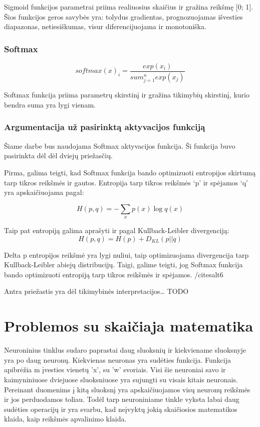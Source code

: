 \documentclass{VUMIFInfKursinis}
\begin{document}
\par
Sigmoid funkcijos parametrai priima realiuosius skaičius ir gražina reikšmę [0; 1].
Šios funkcijos geros savybės yra: tolydus gradientas, prognozuojamas išvesties
diapazonas, netiesiškumas, visur diferencijuojama ir monotoniška. \cite{salt16}

\subsubsection{Softmax}
\[
  softmax(x)_i = \frac{exp(x_i)}{sum_{j=1}^{n}exp(x_j)}
\]

\par
Softmax funkcija priima parametrų skirstinį ir gražina tikimybių skirstinį,
kurio bendra suma yra lygi vienam. \cite{salt16}

\subsubsection{Argumentacija už pasirinktą aktyvacijos funkciją}
\par
Šiame darbe bus naudojama Softmax aktyvacijos funkcija. Ši funkcija buvo
pasirinkta dėl dėl dviejų priežasčių.
\par
Pirma, galima teigti, kad Softmax funkcija bando optimizuoti entropijos
skirtumą tarp tikros reikšmės ir gautos. Entropija tarp tikros reikšmės
‘p’ ir spėjamos ‘q’ yra apskaičiuojama pagal:

\[
H(p, q) = - \sum_{x}p(x) \log q(x)
\]

\par
Taip pat entropiją galima aprašyti ir pagal Kullback-Leibler divergenciją:
\[
H(p, q) = H(p) + D_{KL}(p || q)
\]
\par
Delta p entropijos reikšmė yra lygi nuliui, taip optimizuojama divergencija tarp
Kullback-Leibler abiejų distribucijų. Taigi, galime teigti, jog Softmax funkcija
bando optimizuoti entropiją tarp tikros reikšmės ir spėjamos. /cite{salt6}
\par
Antra priežastis yra dėl tikimybinės interpretacijos…
TODO

\section{Problemos su skaičiaja matematika}
\par
Neuroninius tinklus sudaro paprastai daug sluoksnių ir kiekviename sluoksnyje yra po
daug neuronų. Kiekvienas neuronas yra sudėties funkcija. Funkcija apibrėžia m įvesties
vienetų 'x', su 'w' svoriais. Visi šie neuroniai savo ir kaimyniniuose dviejuose sluoksniuose
yra sujungti su visais kitais neuronais. Pereinant duomenims į kitą sluoksnį yra apskaičiuojamos
visų neuronų reikšmės ir jos perduodamos toliau. Todėl tarp neuroniniame tinkle vyksta
labai daug sudėties operacijų ir yra svarbu, kad neįvyktų jokią skaičiosios matematikos klaida,
kaip reikšmės apvalinimo klaida.
\end{document}
